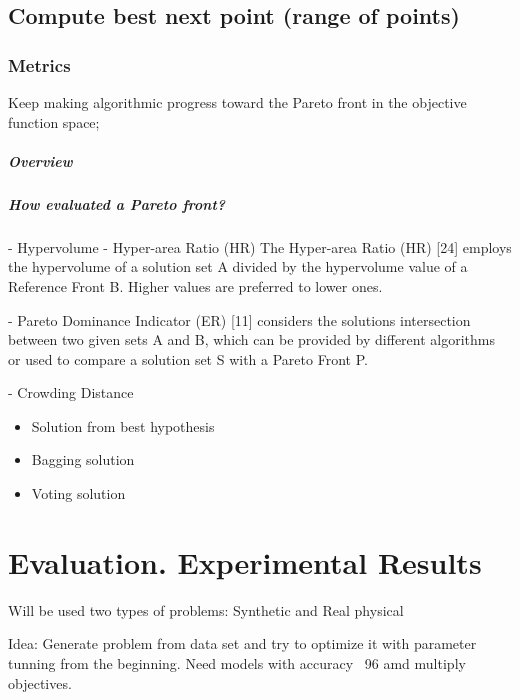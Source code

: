 \documentclass[ms,english]{stthesis}
\begin{document}
        \section{Compute best next point (range of points)}

            \subsection{Metrics}
                Keep making algorithmic progress toward the Pareto front in the objective function space;
                \paragraph{Overview}
                \paragraph{How evaluated a Pareto front?}
                    - Hypervolume
                    - Hyper-area Ratio (HR)
                    The Hyper-area Ratio (HR) [24] employs the hypervolume of a solution set A
                    divided by the hypervolume value of a Reference Front B. Higher values are
                    preferred to lower ones.

                    - Pareto Dominance Indicator (ER) [11] considers the solutions intersection between two given sets A and B, which can be 
                    provided by different algorithms or used to compare a solution set S with a Pareto Front P.

                    - Crowding Distance

            \begin{itemize}
                \item Solution from best hypothesis
                \item Bagging solution
                \item Voting solution                
            \end{itemize}


    \chapter{Evaluation. Experimental Results}

            Will be used two types of problems: Synthetic and Real physical

            Idea: Generate problem from data set and try to optimize it with parameter tunning from the beginning. Need models with accuracy ~96 amd multiply objectives. 
\end{document}
